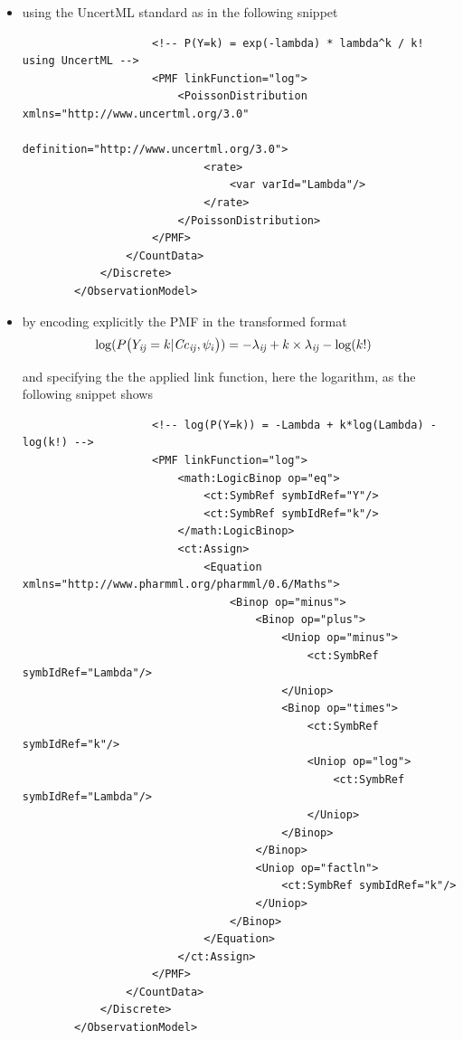 \begin{itemize}
\item
using the UncertML standard as in the following snippet
\lstset{language=XML}
\begin{lstlisting}
                    <!-- P(Y=k) = exp(-lambda) * lambda^k / k! using UncertML -->
                    <PMF linkFunction="log">
                        <PoissonDistribution xmlns="http://www.uncertml.org/3.0" 
                            definition="http://www.uncertml.org/3.0">
                            <rate>
                                <var varId="Lambda"/>
                            </rate>
                        </PoissonDistribution>
                    </PMF>
                </CountData>
            </Discrete>
        </ObservationModel>
\end{lstlisting}
\item
by encoding explicitly the PMF in the transformed format 
\begin{align}
\log(P\big(Y_{\mathit{ij}} & =k | \mathit{Cc}_{\mathit{ij}}, \psi_i\big)) =  -\lambda_{\mathit{ij}} +k\times \lambda_{\mathit{ij}} - \log(k!) \nonumber
\end{align}

and specifying the
the applied link function, here the logarithm, as the following snippet shows
\lstset{language=XML}
\begin{lstlisting}
                    <!-- log(P(Y=k)) = -Lambda + k*log(Lambda) - log(k!) -->
                    <PMF linkFunction="log">
                        <math:LogicBinop op="eq">
                            <ct:SymbRef symbIdRef="Y"/>
                            <ct:SymbRef symbIdRef="k"/>
                        </math:LogicBinop>
                        <ct:Assign>
                            <Equation xmlns="http://www.pharmml.org/pharmml/0.6/Maths">
                                <Binop op="minus">
                                    <Binop op="plus">
                                        <Uniop op="minus">
                                            <ct:SymbRef symbIdRef="Lambda"/>
                                        </Uniop>
                                        <Binop op="times">
                                            <ct:SymbRef symbIdRef="k"/>
                                            <Uniop op="log">
                                                <ct:SymbRef symbIdRef="Lambda"/>
                                            </Uniop>
                                        </Binop>
                                    </Binop>
                                    <Uniop op="factln">
                                        <ct:SymbRef symbIdRef="k"/>
                                    </Uniop>
                                </Binop>
                            </Equation>
                        </ct:Assign>
                    </PMF>
                </CountData>
            </Discrete>
        </ObservationModel> 
\end{lstlisting}
\end{itemize}

